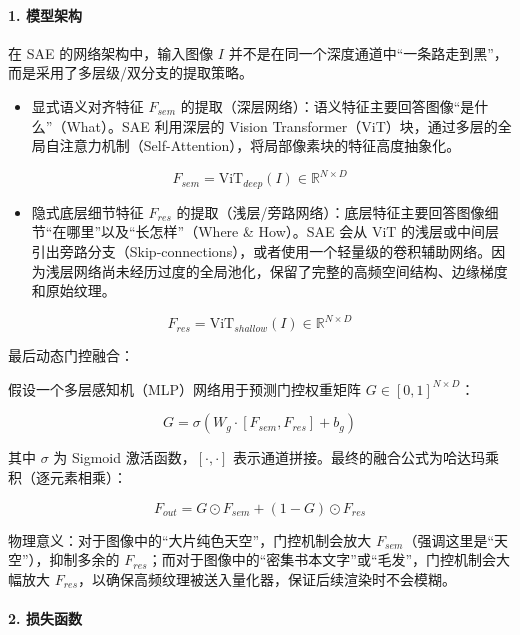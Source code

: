 \hypertarget{ux6a21ux578bux67b6ux6784}{%
\paragraph{1. 模型架构}\label{ux6a21ux578bux67b6ux6784}}

在 SAE 的网络架构中，输入图像 \(I\) 并不是在同一个深度通道中``一条路走到黑''，而是采用了多层级/双分支的提取策略。

\begin{itemize}
\tightlist
\item
  显式语义对齐特征 \(F_{sem}\) 的提取（深层网络）：语义特征主要回答图像``是什么''（What）。SAE 利用深层的 Vision Transformer（ViT）块，通过多层的全局自注意力机制（Self-Attention），将局部像素块的特征高度抽象化。
\end{itemize}

\[
F_{sem}=\mathrm{ViT}_{deep}(I)\in \mathbb{R}^{N\times D}
\]

\begin{itemize}
\tightlist
\item
  隐式底层细节特征 \(F_{res}\) 的提取（浅层/旁路网络）：底层特征主要回答图像细节``在哪里''以及``长怎样''（Where \& How）。SAE 会从 ViT 的浅层或中间层引出旁路分支（Skip-connections），或者使用一个轻量级的卷积辅助网络。因为浅层网络尚未经历过度的全局池化，保留了完整的高频空间结构、边缘梯度和原始纹理。
\end{itemize}

\[
F_{res}=\mathrm{ViT}_{shallow}(I)\in \mathbb{R}^{N\times D}
\]

最后动态门控融合：

假设一个多层感知机（MLP）网络用于预测门控权重矩阵 \(G\in[0,1]^{N\times D}\)：

\[
G=\sigma(W_g\cdot [F_{sem},F_{res}]+b_g)
\]

其中 \(\sigma\) 为 Sigmoid 激活函数，\([\cdot,\cdot]\) 表示通道拼接。最终的融合公式为哈达玛乘积（逐元素相乘）：

\[
F_{out}=G\odot F_{sem}+(1-G)\odot F_{res}
\]

物理意义：对于图像中的``大片纯色天空''，门控机制会放大 \(F_{sem}\)（强调这里是``天空''），抑制多余的 \(F_{res}\)；而对于图像中的``密集书本文字''或``毛发''，门控机制会大幅放大 \(F_{res}\)，以确保高频纹理被送入量化器，保证后续渲染时不会模糊。

\hypertarget{ux635fux5931ux51fdux6570}{%
\paragraph{2. 损失函数}\label{ux635fux5931ux51fdux6570}}

